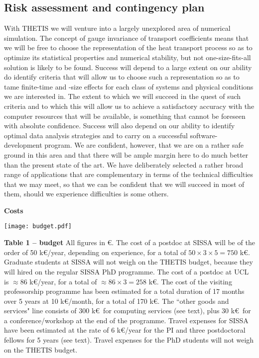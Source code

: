 \subsection*{Risk assessment and contingency plan}
With THETIS we will venture into a largely unexplored area of numerical simulation. The concept of gauge invariance of transport coefficients means that we will be free to choose the representation of the heat transport process so as to optimize its statistical properties and numerical stability, but not one-size-fits-all solution is likely to be found. Success will depend to a large extent on our ability do identify criteria that will allow us to choose such a representation so as to tame finite-time and -size effects for each class of systems and physical conditions we are interested in. The extent to which we will succeed in the quest of such criteria and to which this will allow us to achieve a satisfactory accuracy with the computer resources that will be available, is something that cannot be foreseen with absolute confidence. Success will also depend on our ability to identify optimal data analysis strategies and to carry on a successful software-development program. We are confident, however, that we are on a rather safe ground in this area and that there will be ample margin here to do much better than the present state of the art. We have deliberately selected a rather broad range of applications that are complementary in terms of the technical difficulties that we may meet, so that we can be confident that we will succeed in most of them, should we experience difficulties is some others.

\medskip\noindent\textbf{Costs}
\begin{table}[h!]
\begin{minipage}{0.6\textwidth}
\centering \texttt{[image: budget.pdf]}
\end{minipage}
\begin{minipage}{0.4\textwidth}
\begin{footnotesize}
\textbf{Table  1 -- budget} All figures in \euro. The cost of a postdoc at SISSA will be of the order of 50 k\euro/year, depending on experience, for a total of $50\times 3\times 5= 750$ k\euro. Graduate students at SISSA will not weigh on the THETIS budget, because they will hired on the regular SISSA PhD programme. The cost of a postdoc at UCL is $\approx 86$ k\euro/year, for a total of $\approx 86\times 3 =258$ k\euro. The cost of the visiting professorship programme has been estimated for a total duration of 17 months over 5 years at 10 k\euro/month, for a total of 170 k\euro. The ``other goods and services" line consists of 300 k\euro\ for computing services (see text), plus 30 k\euro\ for a conference/workshop at the end of the programme. Travel expenses for SISSA have been estimated at the rate of 6 k\euro/year for the PI and three postdoctoral fellows for 5 years (see text). Travel expenses for the PhD students will not weigh on the THETIS budget.\end{footnotesize}
\end{minipage} 
\label{fig:budget}
\end{table}

\newpage
\begin{small}


\end{small}


